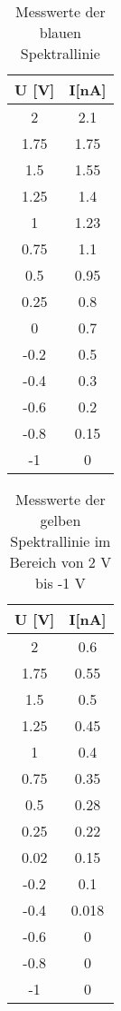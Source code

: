   \begin{table}[H]
    \centering
    \caption{Messwerte der blauen Spektrallinie}
    \begin{tabular}{c c}
     \toprule
      U [V]& I[nA]\\
      \midrule
      2    & 2.1  \\
      1.75 & 1.75 \\
      1.5  & 1.55 \\
      1.25 & 1.4  \\
      1    & 1.23 \\
      0.75 & 1.1  \\
      0.5  & 0.95 \\
      0.25 & 0.8  \\
      0    & 0.7  \\
     -0.2  & 0.5  \\
     -0.4  & 0.3  \\
     -0.6  & 0.2  \\
     -0.8  & 0.15 \\
     -1    & 0    \\
     \bottomrule
    \end{tabular}
  \end{table} 
  \begin{table}[H]
    \centering
    \caption{Messwerte der gelben Spektrallinie im Bereich von 2 V bis -1 V}
    \begin{tabular}{c c}
     \toprule
      U [V]& I[nA]\\
      \midrule
      2    & 0.6   \\
      1.75 & 0.55  \\
      1.5  & 0.5   \\
      1.25 & 0.45  \\
      1    & 0.4   \\
      0.75 & 0.35  \\
      0.5  & 0.28  \\
      0.25 & 0.22  \\
      0.02 & 0.15  \\
     -0.2  & 0.1   \\
     -0.4  & 0.018 \\
     -0.6  & 0     \\
     -0.8  & 0     \\
     -1    & 0     \\
     \bottomrule
    \end{tabular}
  \end{table} 
